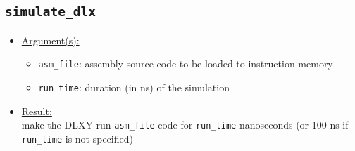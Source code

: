 \subsection{\texttt{simulate\_dlx}}
\begin{itemize}
	\item \underline{Argument(s):}
		\begin{itemize}
			\item \texttt{asm\_file}: assembly source code to be
				loaded to instruction memory
			\item \texttt{run\_time}: duration (in ns) of the
				simulation
		\end{itemize}
	\item \underline{Result:} \\
		make the DLXY run \texttt{asm\_file} code for \texttt{run\_time}
		nanoseconds (or 100 ns if \texttt{run\_time} is not specified)
\end{itemize}

